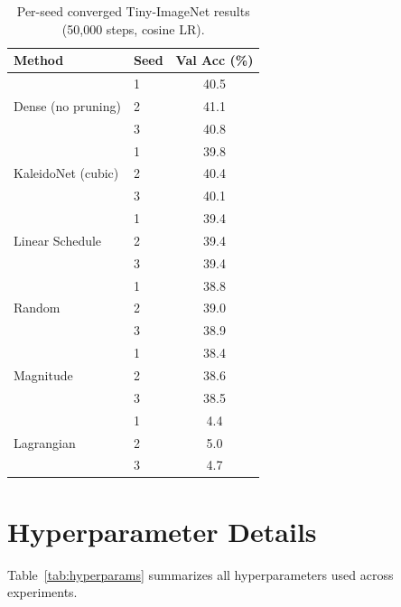 \begin{table}[h]
\centering
\caption{Per-seed converged Tiny-ImageNet results (50{,}000 steps, cosine LR).}
\label{tab:per_seed_tinyimagenet}
\small
\begin{tabular}{llc}
\toprule
\textbf{Method} & \textbf{Seed} & \textbf{Val Acc (\%)} \\
\midrule
\multirow{3}{*}{Dense (no pruning)} & 1 & 40.5 \\
& 2 & 41.1 \\
& 3 & 40.8 \\
\midrule
\multirow{3}{*}{KaleidoNet (cubic)} & 1 & 39.8 \\
& 2 & 40.4 \\
& 3 & 40.1 \\
\midrule
\multirow{3}{*}{Linear Schedule} & 1 & 39.4 \\
& 2 & 39.4 \\
& 3 & 39.4 \\
\midrule
\multirow{3}{*}{Random} & 1 & 38.8 \\
& 2 & 39.0 \\
& 3 & 38.9 \\
\midrule
\multirow{3}{*}{Magnitude} & 1 & 38.4 \\
& 2 & 38.6 \\
& 3 & 38.5 \\
\midrule
\multirow{3}{*}{Lagrangian} & 1 & 4.4 \\
& 2 & 5.0 \\
& 3 & 4.7 \\
\bottomrule
\end{tabular}
\end{table}

\section{Hyperparameter Details}
\label{sec:appendix_hyperparams}

Table~\ref{tab:hyperparams} summarizes all hyperparameters used across experiments.

